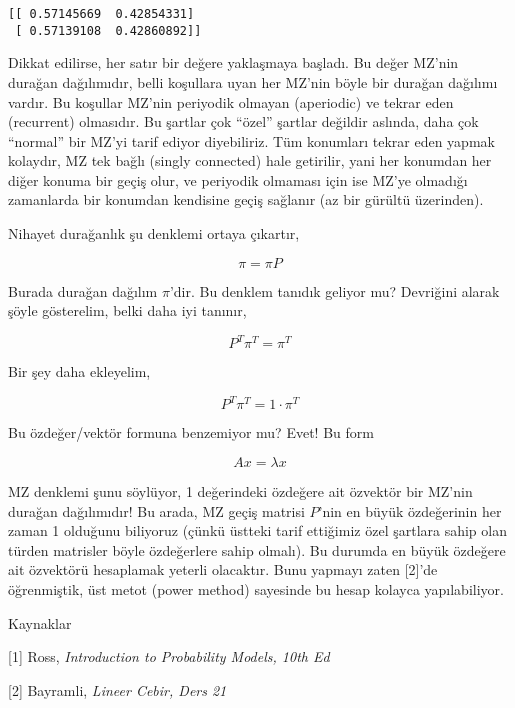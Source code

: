 \documentclass[12pt,fleqn]{article}\usepackage{../../common}
\begin{document}
\begin{verbatim}
[[ 0.57145669  0.42854331]
 [ 0.57139108  0.42860892]]
\end{verbatim}

Dikkat edilirse, her satır bir değere yaklaşmaya başladı. Bu değer MZ'nin
durağan dağılımıdır, belli koşullara uyan her MZ'nin böyle bir durağan
dağılımı vardır. Bu koşullar MZ'nin periyodik olmayan (aperiodic) ve tekrar
eden (recurrent) olmasıdır. Bu şartlar çok ``özel'' şartlar değildir
aslında, daha çok ``normal'' bir MZ'yi tarif ediyor diyebiliriz. Tüm
konumları tekrar eden yapmak kolaydır, MZ tek bağlı (singly connected) hale
getirilir, yani her konumdan her diğer konuma bir geçiş olur, ve periyodik
olmaması için ise MZ'ye olmadığı zamanlarda bir konumdan kendisine geçiş
sağlanır (az bir gürültü üzerinden). 

Nihayet durağanlık şu denklemi ortaya çıkartır,

$$ \pi = \pi P $$

Burada durağan dağılım $\pi$'dir. Bu denklem tanıdık geliyor mu?  Devriğini
alarak şöyle gösterelim, belki daha iyi tanınır, 

$$ P^T\pi^T = \pi^T $$

Bir şey daha ekleyelim, 

$$ P^T\pi^T = 1 \cdot \pi^T $$

Bu özdeğer/vektör formuna benzemiyor mu? Evet! Bu form 

$$ Ax = \lambda x $$

MZ denklemi şunu söylüyor, 1 değerindeki özdeğere ait özvektör bir MZ'nin
durağan dağılımıdır! Bu arada, MZ geçiş matrisi $P$'nin en büyük
özdeğerinin her zaman 1 olduğunu biliyoruz (çünkü üstteki tarif ettiğimiz
özel şartlara sahip olan türden matrisler böyle özdeğerlere sahip
olmalı). Bu durumda en büyük özdeğere ait özvektörü hesaplamak yeterli
olacaktır. Bunu yapmayı zaten [2]'de öğrenmiştik, üst metot (power method)
sayesinde bu hesap kolayca yapılabiliyor.



Kaynaklar

[1] Ross, {\em Introduction to Probability Models, 10th Ed}

[2] Bayramli, {\em Lineer Cebir, Ders 21}
\end{document}
